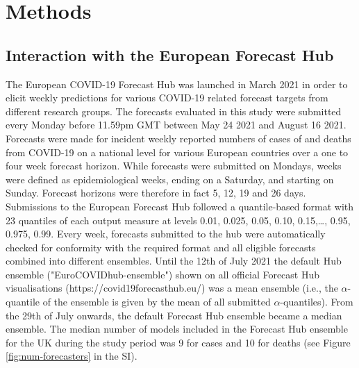 \documentclass[10pt,a4paper,twocolumn]{article}
\begin{document}
\section*{Methods}

\subsection*{Interaction with the European Forecast Hub}

The European COVID-19 Forecast Hub \cite{sherrattPredictivePerformanceMultimodel2022} was launched in March 2021 in order to elicit weekly predictions for various COVID-19 related forecast targets from different research groups. The forecasts evaluated in this study were submitted every Monday before 11.59pm GMT between May 24 2021 and August 16 2021. Forecasts were made for incident weekly reported numbers of cases of and deaths from COVID-19 on a national level for various European countries over a one to four week forecast horizon. While forecasts were submitted on Mondays, weeks were defined as epidemiological weeks, ending on a Saturday, and starting on Sunday. Forecast horizons were therefore in fact 5, 12, 19 and 26 days. Submissions to the European Forecast Hub followed a quantile-based format with 23 quantiles of each output measure at levels 0.01, 0.025, 0.05, 0.10, 0.15,…, 0.95, 0.975, 0.99.
Every week, forecasts submitted to the hub were automatically checked for conformity with the required format and all eligible forecasts combined into different ensembles. Until the 12th of July 2021 the default Hub ensemble ("EuroCOVIDhub-ensemble") shown on all official Forecast Hub visualisations (https://covid19forecasthub.eu/) was a mean ensemble (i.e., the $\alpha$-quantile of the ensemble is given by the mean of all submitted $\alpha$-quantiles). From the 29th of July onwards, the default Forecast Hub ensemble became a median ensemble. The median number of models included in the Forecast Hub ensemble for the UK during the study period was 9 for cases and 10 for deaths (see Figure \ref{fig:num-forecasters} in the SI). 
\end{document}
